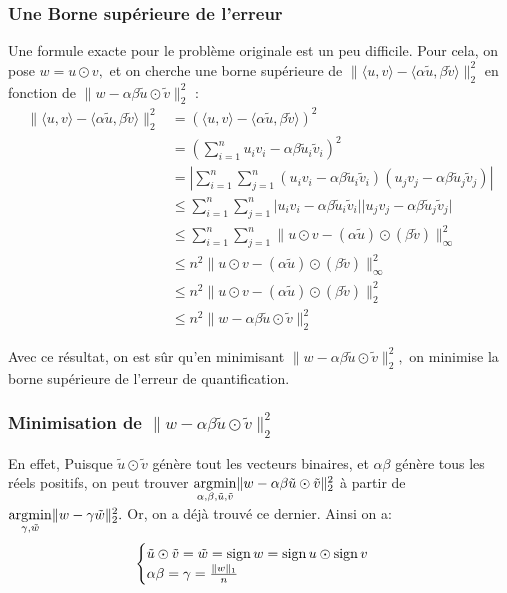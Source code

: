 \subsubsection{Une Borne supérieure de l'erreur}
Une formule exacte pour le problème originale est un peu difficile. Pour cela, on pose $w=u\odot v,$ et on cherche une borne supérieure de $\lVert \langle  u,v \rangle - \langle  \alpha \tilde u,\beta \tilde v \rangle \rVert_2^2$ en fonction de $\lVert w-\alpha\beta \tilde u \odot \tilde v\rVert_2^2$ \cite{XnorNetPaper}:
\begin{align*}
	\lVert \langle  u,v \rangle - \langle  \alpha \tilde u,\beta \tilde v \rangle \rVert_2^2&=(\langle  u,v \rangle - \langle  \alpha \tilde u,\beta \tilde v \rangle)^2 \\
	&= \left(\sum_{i=1}^n u_iv_i-\alpha\beta \tilde u_i \tilde v_i\right)^2 \\
	&= \left\lvert \sum_{i=1}^n\sum_{j=1}^n (u_iv_i-\alpha\beta \tilde u_i\tilde v_i) (u_jv_j-\alpha\beta \tilde u_j\tilde v_j)  \right\rvert \\
	&\leq \sum_{i=1}^n\sum_{j=1}^n \lvert u_iv_i-\alpha\beta \tilde u_i\tilde v_i \rvert  \lvert u_jv_j-\alpha\beta \tilde u_j\tilde v_j \rvert \\
	&\leq \sum_{i=1}^n\sum_{j=1}^n \lVert u\odot v - (\alpha \tilde u) \odot (\beta \tilde v) \rVert_\infty^2\\
	&\leq n^2 \lVert u\odot v - (\alpha \tilde u) \odot (\beta \tilde v) \rVert_\infty^2\\
	&\leq n^2\lVert u\odot v - (\alpha \tilde u) \odot (\beta \tilde v) \rVert_2^2\\
	&\leq  n^2\lVert w - \alpha \beta \tilde u \odot \tilde v \rVert_2^2
\end{align*}

Avec ce résultat, on est sûr qu'en minimisant $\lVert w - \alpha \beta \tilde u \odot \tilde v \rVert_2^2,$ on minimise la borne supérieure de l'erreur de quantification.
\subsubsection{Minimisation de $\lVert w - \alpha \beta \tilde u \odot \tilde v \rVert_2^2$}
En effet, Puisque $\tilde u \odot \tilde v$ génère tout les vecteurs binaires, et $\alpha \beta$ génère tous les réels positifs, on peut trouver $\operatorname*{\arg\!\min}\limits_{\alpha,\beta,\tilde u ,\tilde v} \lVert w - \alpha \beta \tilde u \odot \tilde v \rVert_2^2$ à partir de $\operatorname*{\arg\!\min}\limits_{\gamma,\tilde w }\lVert w - \gamma\tilde w \rVert_2^2.$
\newline Or, on a déjà trouvé ce dernier. Ainsi on a:
\begin{equation}
	\begin{cases}
		\tilde u \odot \tilde v = \tilde w=\operatorname{sign} w = \operatorname{sign} u \odot \operatorname{sign} v \\
		\alpha\beta = \gamma = \frac{\lVert w \rVert_1}{n}
	\end{cases}
\end{equation}
